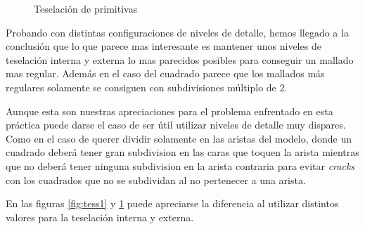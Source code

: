 \documentclass[10pt,oneside,a4paper]{article}
\begin{document}
\begin{figure}[!htb]
\centering
    \qquad
\caption{Teselación de primitivas}
\label{fig:tess2}
\end{figure}

Probando con distintas configuraciones de niveles de detalle, hemos llegado a la conclusión que lo que parece mas interesante es mantener unos niveles de teselación interna y externa lo mas parecidos posibles para conseguir un mallado mas regular. Además en el caso del cuadrado parece que los mallados más regulares solamente se consiguen con subdivisiones múltiplo de 2.

Aunque esta son nuestras apreciaciones para el problema enfrentado en esta práctica puede darse el caso de ser útil utilizar niveles de detalle muy dispares. Como en el caso de querer dividir solamente en las aristas del modelo, donde un cuadrado deberá tener gran subdivision en las caras que toquen la arista mientras que no deberá tener ninguna subdivision en la arista contraria para evitar \textit{cracks} con los cuadrados que no se subdividan al no pertenecer a una arista.

En las figuras \ref{fig:tess1} y \ref{fig:tess2} puede apreciarse la diferencia al utilizar distintos valores para la teselación interna y externa.
\end{document}
